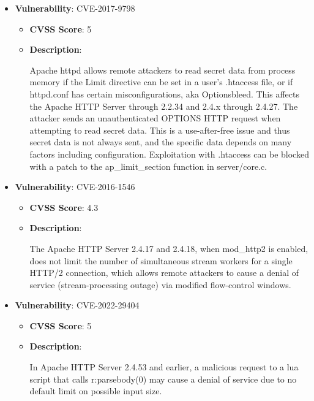 \documentclass{article}
\begin{document}
\begin{itemize}
        \item \textbf{Vulnerability}: CVE-2017-9798
        \begin{itemize}
            \item \textbf{CVSS Score}:  5 
            \item \textbf{Description}:
            \parbox[t]{0.9\linewidth}{
                \ttfamily Apache httpd allows remote attackers to read secret data from process memory if the Limit directive can be set in a user's .htaccess file, or if httpd.conf has certain misconfigurations, aka Optionsbleed. This affects the Apache HTTP Server through 2.2.34 and 2.4.x through 2.4.27. The attacker sends an unauthenticated OPTIONS HTTP request when attempting to read secret data. This is a use-after-free issue and thus secret data is not always sent, and the specific data depends on many factors including configuration. Exploitation with .htaccess can be blocked with a patch to the ap\_limit\_section function in server/core.c.
            }
        \end{itemize}
    
        \item \textbf{Vulnerability}: CVE-2016-1546
        \begin{itemize}
            \item \textbf{CVSS Score}:  4.3 
            \item \textbf{Description}:
            \parbox[t]{0.9\linewidth}{
                \ttfamily The Apache HTTP Server 2.4.17 and 2.4.18, when mod\_http2 is enabled, does not limit the number of simultaneous stream workers for a single HTTP/2 connection, which allows remote attackers to cause a denial of service (stream-processing outage) via modified flow-control windows.
            }
        \end{itemize}
    
        \item \textbf{Vulnerability}: CVE-2022-29404
        \begin{itemize}
            \item \textbf{CVSS Score}:  5 
            \item \textbf{Description}:
            \parbox[t]{0.9\linewidth}{
                \ttfamily In Apache HTTP Server 2.4.53 and earlier, a malicious request to a lua script that calls r:parsebody(0) may cause a denial of service due to no default limit on possible input size.
            }
        \end{itemize}
    

\end{itemize}
\end{document}
